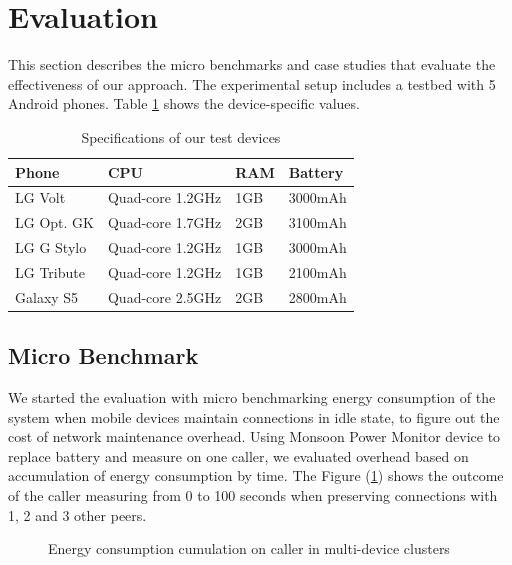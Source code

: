 \documentclass{sig-alternate}[10pt]
\begin{document}
\section{Evaluation}
\label{sec:eval}
This section describes the micro benchmarks and case studies that evaluate the effectiveness of our approach. The experimental setup includes a testbed with 5 Android phones. Table \ref{table:devices} shows the device-specific values.

\begin{table}[h]
\caption{Specifications of our test devices}
\label{table:devices}
\centering
\begin{tabular}{| l | l | l | l |}
    \hline
    Phone & CPU & RAM & Battery \\ \hline
    LG Volt & Quad-core 1.2GHz & 1GB & 3000mAh\\ \hline
		LG Opt. GK & Quad-core 1.7GHz & 2GB & 3100mAh\\ \hline
		LG G Stylo & Quad-core 1.2GHz & 1GB & 3000mAh\\ \hline
		LG Tribute & Quad-core 1.2GHz & 1GB & 2100mAh\\ \hline
		Galaxy S5 & Quad-core 2.5GHz & 2GB & 2800mAh\\ \hline
\end{tabular}
\end{table}

\subsection{Micro Benchmark}
We started the evaluation with micro benchmarking energy consumption of the system when mobile devices maintain connections in idle state, to figure out the cost of network maintenance overhead. Using Monsoon Power Monitor device \cite{moosoon} to replace battery and measure on one caller, we evaluated overhead based on accumulation of energy consumption by time. The Figure (\ref{fig:microb_24}) shows the outcome of the caller measuring from 0 to 100 seconds when preserving connections with 1, 2 and 3 other peers. 

\begin{figure}
	\hspace*{-0.15cm}
	\caption{Energy consumption cumulation on caller in multi-device clusters}
	\label{fig:microb_24}
\end{figure}
\end{document}
